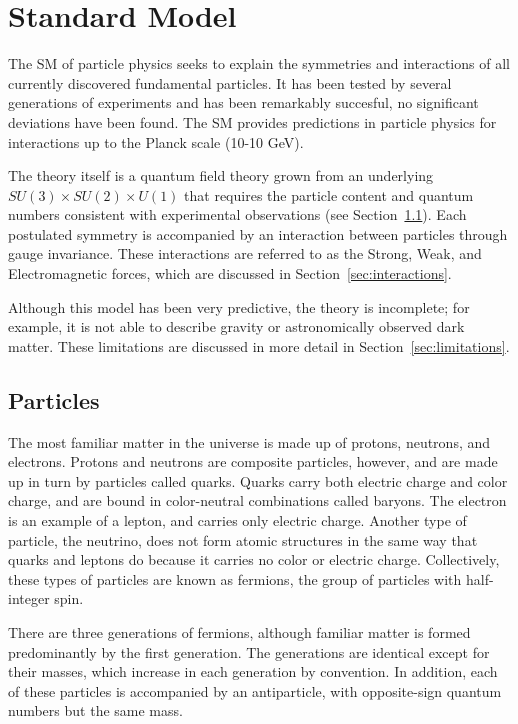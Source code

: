 \chapter{Standard Model}

\label{ch:standardmodel}

The \ac{SM} of particle physics seeks to explain the symmetries and interactions of all currently discovered fundamental particles. 
It has been tested by several generations of experiments and has been remarkably succesful, no significant deviations have been found. 
The \ac{SM} provides predictions in particle physics for interactions up to the Planck scale (10-10 GeV). 

The theory itself is a quantum field theory grown from an underlying $SU(3) \times SU(2) \times U(1)$ that requires the particle content and quantum numbers consistent with experimental observations (see Section~\ref{sec:particles}). 
Each postulated symmetry is accompanied by an interaction between particles through gauge invariance. 
These interactions are referred to as the Strong, Weak, and Electromagnetic forces, which are discussed in Section~\ref{sec:interactions}. 

Although this model has been very predictive, the theory is incomplete; for example, it is not able to describe gravity or astronomically observed dark matter. 
These limitations are discussed in more detail in Section~\ref{sec:limitations}. 

\section{Particles}
\label{sec:particles}

The most familiar matter in the universe is made up of protons, neutrons, and electrons. 
Protons and neutrons are composite particles, however, and are made up in turn by particles called quarks. 
Quarks carry both electric charge and color charge, and are bound in color-neutral combinations called baryons. 
The electron is an example of a lepton, and carries only electric charge. 
Another type of particle, the neutrino, does not form atomic structures in the same way that quarks and leptons do because it carries no color or electric charge. 
Collectively, these types of particles are known as fermions, the group of particles with half-integer spin. 

There are three generations of fermions, although familiar matter is formed predominantly by the first generation. 
The generations are identical except for their masses, which increase in each generation by convention. 
In addition, each of these particles is accompanied by an antiparticle, with opposite-sign quantum numbers but the same mass.

